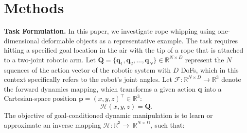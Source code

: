 \documentclass{article}
\begin{document}



  


\section{Methods}
\textbf{Task Formulation.}
In this paper, we investigate rope whipping using one-dimensional deformable objects as a representative example. The task requires hitting a specified goal location in the air with the tip of a rope that is attached to a two-joint robotic arm.
Let  $\bm{Q} = \{\boldsymbol{q}_1, \boldsymbol{q}_2, \dots, \boldsymbol{q}_N\}  \in \mathbb{R}^{N\times D}$  represent the $N$ squences of the action vector of the robotic system with $D$ DoFs, which in this context specifically refers to the robot's joint angles. Let $\mathcal{F}: \mathbb{R}^{N\times D} \to \mathbb{R}^3$ denote the forward dynamics mapping, which transforms a given action $\boldsymbol{q}$ into a Cartesian-space position $\mathbf{p} = (x, y, z)^\top \in \mathbb{R}^3$:
\begin{equation}
 \mathcal{H}(x, y, z) = \bm{Q}.
\end{equation}
The objective of goal-conditioned dynamic manipulation is to learn or approximate an inverse mapping $\mathcal{H}: \mathbb{R}^3 \to \ \mathbb{R}^{N\times D}$, such that:
\end{document}
